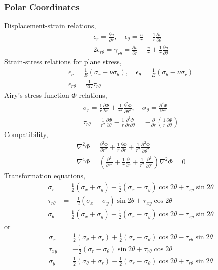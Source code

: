 \subsubsection*{Polar Coordinates}
Displacement-strain relations,
\begin{gather*}
    \epsilon_r = \frac{\partial u}{\partial r}, \quad \epsilon_\theta = \frac{u}{r} + \frac{1}{r} \frac{\partial v}{\partial \theta} \\
    2\epsilon_{r\theta} = \gamma_{r\theta} = \frac{\partial v}{\partial r} - \frac{v}{r} + \frac{1}{r} \frac{\partial u}{\partial \theta}
\end{gather*} 
Strain-stress relations for plane stress,
\begin{gather*}
    \epsilon_r = \frac{1}{E} \left( \sigma_r - \nu \sigma_\theta \right), \quad \epsilon_\theta = \frac{1}{E} \left( \sigma_\theta - \nu \sigma_r \right) \\
    \epsilon_{r\theta} = \frac{1}{2G} \tau_{r\theta} 
\end{gather*}
Airy's stress function $\Phi$ relations,
\begin{gather*}
    \sigma_r = \frac{1}{r}\frac{\partial \Phi}{\partial r} + \frac{1}{r^2} \frac{\partial^2 \Phi}{\partial \theta^2}, \quad \sigma_\theta = 
    \frac{\partial^2 \Phi}{\partial r^2} \\
    \tau_{r\theta} = \frac{1}{r^2}\frac{\partial \Phi}{\partial \theta} - \frac{1}{r}\frac{\partial^2 \Phi}{\partial r \partial \theta} = -
    \frac{\partial}{\partial r} \left( \frac{1}{r} \frac{\partial \Phi}{\partial \theta} \right)
\end{gather*}
Compatibility,
\begin{gather*}
    \nabla^2 \Phi = \frac{\partial^2 \Phi}{\partial r^2} + \frac{1}{r} \frac{\partial \Phi}{\partial r} + \frac{1}{r^2} \frac{\partial^2 \Phi}{\partial \theta^2} \\
    \nabla^4 \Phi = \left(\frac{\partial^2}{\partial r^2} + \frac{1}{r} \frac{\partial}{\partial r} + \frac{1}{r^2} \frac{\partial^2}{\partial \theta^2} \right) 
    \nabla^2 \Phi=0
\end{gather*}
Transformation equations,
\begin{align*}
    \sigma_r &= \frac{1}{2}(\sigma_x + \sigma_y) + \frac{1}{2}(\sigma_x - \sigma_y) \cos{2\theta} + \tau_{xy} \sin{2\theta} \\
    \tau_{r\theta} &= -\frac{1}{2}(\sigma_x - \sigma_y) \sin{2\theta} + \tau_{xy} \cos{2\theta} \\
    \sigma_\theta &= \frac{1}{2}(\sigma_x + \sigma_y) - \frac{1}{2}(\sigma_x - \sigma_y) \cos{2\theta} - \tau_{xy} \sin{2\theta}
\end{align*}
or 
\begin{align*}
    \sigma_x &= \frac{1}{2}(\sigma_\theta + \sigma_r) + \frac{1}{2}(\sigma_r - \sigma_\theta) \cos{2\theta} - \tau_{r\theta} \sin{2\theta} \\
    \tau_{xy} &= -\frac{1}{2}(\sigma_r - \sigma_\theta) \sin{2\theta} + \tau_{r\theta} \cos{2\theta} \\
    \sigma_y &= \frac{1}{2}(\sigma_\theta + \sigma_r) - \frac{1}{2}(\sigma_r - \sigma_\theta) \cos{2\theta} + \tau_{r\theta} \sin{2\theta}
\end{align*}

